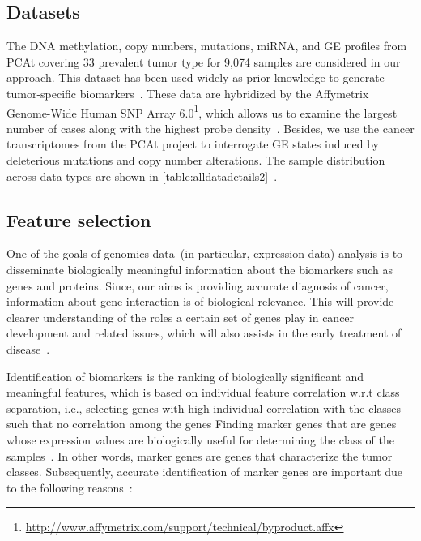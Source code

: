 \subsection{Datasets}
The DNA methylation, copy numbers, mutations, miRNA, and GE profiles from PCAt covering 33 prevalent tumor type for 9,074 samples are considered in our approach. This dataset has been used widely as prior knowledge to generate tumor-specific biomarkers~\cite{way2018machine,hoadley2018cell,malta2018machine}. These data are hybridized by the Affymetrix Genome-Wide Human SNP Array 6.0\footnote{\url{http://www.affymetrix.com/support/technical/byproduct.affx}}, which allows us to examine the largest number of cases along with the highest probe density~\cite{31Park}. Besides, we use the cancer transcriptomes from the PCAt project to interrogate GE states induced by deleterious mutations and copy number alterations. The sample distribution across data types are shown in \cref{table:alldatadetails2}~\cite{weinstein2013cancer}. 

\subsection{Feature selection}
One of the goals of genomics data~(in particular, expression data) analysis is to disseminate biologically meaningful information about the biomarkers such as genes and proteins. 
Since, our aims is providing accurate diagnosis of cancer, information about gene interaction is of biological relevance. This will provide clearer understanding of the roles a certain set of genes play in cancer development and related issues, which will also assists in the  early treatment of disease~\cite{lu2003cancer}. %

\hspace*{3.5mm} Identification of biomarkers is the ranking of biologically significant and meaningful features, which is based on individual feature correlation w.r.t class separation, i.e., selecting genes with high individual correlation with the classes such that no correlation among the genes Finding marker genes that are genes whose expression values are biologically useful for determining the class of the samples~\cite{lu2003cancer}. In other words, marker genes are genes that characterize the tumor classes. Subsequently, accurate identification of marker genes are important due to the following reasons~\cite{lu2003cancer}:


